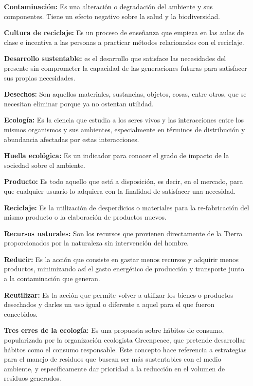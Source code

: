 \textbf{Contaminación:} Es una alteración o degradación del ambiente y sus componentes. Tiene un efecto negativo sobre la salud y la biodiversidad.

\textbf{Cultura de reciclaje:} Es un proceso de enseñanza que empieza en las aulas de clase e incentiva a las personas a practicar métodos relacionados con el reciclaje.

\textbf{Desarrollo sustentable:} es el desarrollo que satisface las necesidades del presente sin comprometer la capacidad de las generaciones futuras para satisfacer sus propias necesidades.

\textbf{Desechos:} Son aquellos materiales, sustancias, objetos, cosas, entre otros, que se necesitan eliminar porque ya no ostentan utilidad.

\textbf{Ecología:} Es la ciencia que estudia a los seres vivos y las interacciones entre los mismos organismos y sus ambientes, especialmente en términos de distribución y abundancia afectadas por estas interacciones.

\textbf{Huella ecológica:} Es un indicador para conocer el grado de impacto de la sociedad sobre el ambiente.

\textbf{Producto:} Es todo aquello que está a disposición, es decir, en el mercado, para que cualquier usuario lo adquiera con la finalidad de satisfacer una necesidad.

\textbf{Reciclaje:} Es la utilización de desperdicios o materiales para la re-fabricación del mismo producto o la elaboración de productos nuevos.

\textbf{Recursos naturales:} Son los recursos que provienen directamente de la Tierra proporcionados por la naturaleza sin intervención del hombre.

\textbf{Reducir:} Es la acción que consiste en gastar menos recursos y adquirir menos productos, minimizando así el gasto energético de producción y transporte junto a la contaminación que generan.

\textbf{Reutilizar:} Es la acción que permite volver a utilizar los bienes o productos desechados y darles un uso igual o diferente a aquel para el que fueron concebidos.

\textbf{Tres erres de la ecología:} Es una propuesta sobre hábitos de consumo, popularizada por la organización ecologista Greenpeace, que pretende desarrollar hábitos como el consumo responsable. Este concepto hace referencia a estrategias para el manejo de residuos que buscan ser más sustentables con el medio ambiente, y específicamente dar prioridad a la reducción en el volumen de residuos generados.

\newpage
